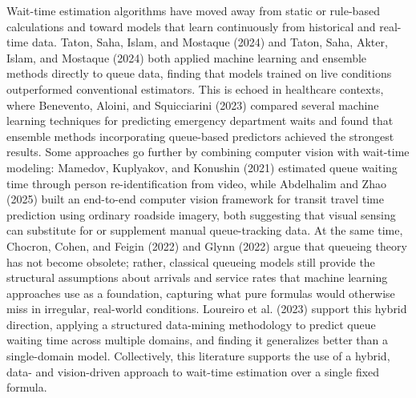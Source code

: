 \documentclass{research}
\begin{document}
Wait-time estimation algorithms have moved away from static or rule-based calculations and toward models that learn continuously from historical and real-time data. Taton, Saha, Islam, and Mostaque (2024) and Taton, Saha, Akter, Islam, and Mostaque (2024) both applied machine learning and ensemble methods directly to queue data, finding that models trained on live conditions outperformed conventional estimators. This is echoed in healthcare contexts, where Benevento, Aloini, and Squicciarini (2023) compared several machine learning techniques for predicting emergency department waits and found that ensemble methods incorporating queue-based predictors achieved the strongest results. Some approaches go further by combining computer vision with wait-time modeling: Mamedov, Kuplyakov, and Konushin (2021) estimated queue waiting time through person re-identification from video, while Abdelhalim and Zhao (2025) built an end-to-end computer vision framework for transit travel time prediction using ordinary roadside imagery, both suggesting that visual sensing can substitute for or supplement manual queue-tracking data. At the same time, Chocron, Cohen, and Feigin (2022) and Glynn (2022) argue that queueing theory has not become obsolete; rather, classical queueing models still provide the structural assumptions about arrivals and service rates that machine learning approaches use as a foundation, capturing what pure formulas would otherwise miss in irregular, real-world conditions. Loureiro et al. (2023) support this hybrid direction, applying a structured data-mining methodology to predict queue waiting time across multiple domains, and finding it generalizes better than a single-domain model. Collectively, this literature supports the use of a hybrid, data- and vision-driven approach to wait-time estimation over a single fixed formula.
\end{document}
